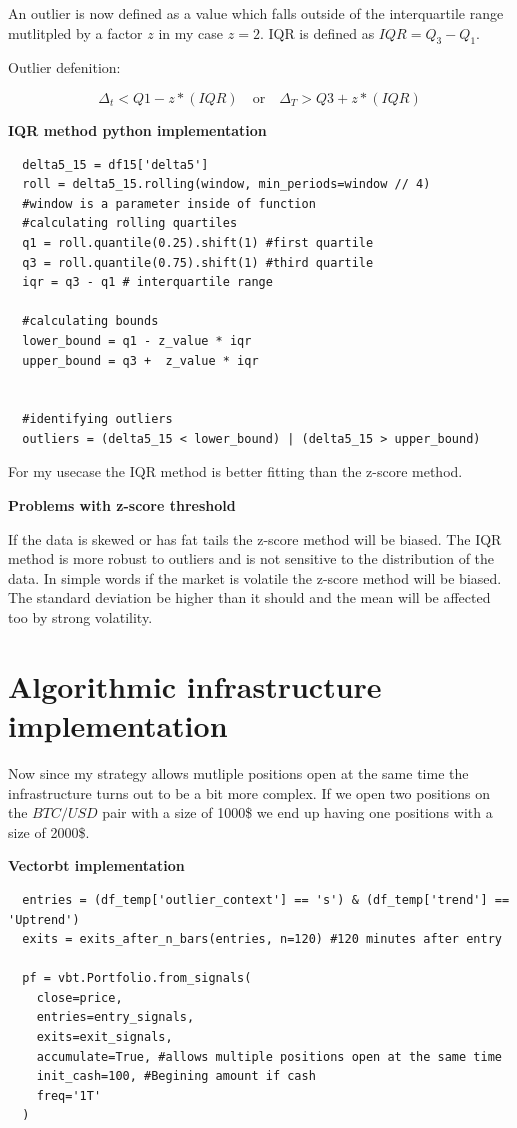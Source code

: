 \documentclass[12pt]{article}
\begin{document}
An outlier is now defined as a value which falls outside of the interquartile range mutlitpled by a factor $z$ in my case $z = 2$. IQR is defined as $IQR = Q_3 - Q_1$.


Outlier defenition:

\begin{equation*}
  \Delta_t < Q1-z*(IQR) \quad \text{or} \quad \Delta_T >Q3+z*(IQR)
\end{equation*}

\newpage
\textbf{IQR method python implementation}
\begin{verbatim}
  delta5_15 = df15['delta5']
  roll = delta5_15.rolling(window, min_periods=window // 4)
  #window is a parameter inside of function
  #calculating rolling quartiles
  q1 = roll.quantile(0.25).shift(1) #first quartile
  q3 = roll.quantile(0.75).shift(1) #third quartile
  iqr = q3 - q1 # interquartile range

  #calculating bounds
  lower_bound = q1 - z_value * iqr
  upper_bound = q3 +  z_value * iqr
 

  #identifying outliers
  outliers = (delta5_15 < lower_bound) | (delta5_15 > upper_bound)
\end{verbatim}



For my usecase the IQR method is better fitting than the z-score method. 




\textbf{Problems with z-score threshold}

If the data is skewed or has fat tails the z-score method will be biased. The IQR method is more robust to outliers and is not sensitive to the distribution of the data. In simple words if the market is volatile the z-score method will be biased. The standard deviation be higher than it should and the mean will be affected too by strong volatility.







\newpage
\section{Algorithmic infrastructure implementation}
Now since my strategy allows mutliple positions open at the same time the infrastructure turns out to be a bit more complex. If we open two positions on the $BTC/USD$ pair with a size of 1000\$ we end up having one positions with a size of 2000\$. 


\textbf{Vectorbt implementation}
\begin{verbatim}
  entries = (df_temp['outlier_context'] == 's') & (df_temp['trend'] == 'Uptrend')  
  exits = exits_after_n_bars(entries, n=120) #120 minutes after entry
  
  pf = vbt.Portfolio.from_signals(
    close=price,
    entries=entry_signals,
    exits=exit_signals,
    accumulate=True, #allows multiple positions open at the same time
    init_cash=100, #Begining amount if cash
    freq='1T'
  ) 
\end{verbatim}
\end{document}
